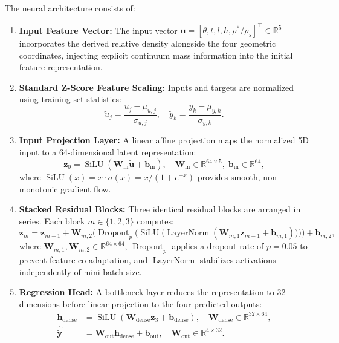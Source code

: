 The neural architecture consists of:
\begin{enumerate}
\item \textbf{Input Feature Vector:} The input vector $\mathbf{u} = [\theta, t, l, h, \rho^*/\rho_s]^\top \in \mathbb{R}^5$ incorporates the derived relative density alongside the four geometric coordinates, injecting explicit continuum mass information into the initial feature representation.
\item \textbf{Standard Z-Score Feature Scaling:} Inputs and targets are normalized using training-set statistics:
\begin{equation}
\tilde{u}_j = \frac{u_j - \mu_{u,j}}{\sigma_{u,j}}, \quad \tilde{y}_k = \frac{y_k - \mu_{y,k}}{\sigma_{y,k}}.
\label{eq:zscore_scaling}
\end{equation}
\item \textbf{Input Projection Layer:} A linear affine projection maps the normalized 5D input to a 64-dimensional latent representation:
\begin{equation}
\mathbf{z}_0 = \operatorname{SiLU}(\mathbf{W}_{\text{in}} \tilde{\mathbf{u}} + \mathbf{b}_{\text{in}}), \quad \mathbf{W}_{\text{in}} \in \mathbb{R}^{64 \times 5}, \; \mathbf{b}_{\text{in}} \in \mathbb{R}^{64},
\label{eq:input_projection}
\end{equation}
where $\operatorname{SiLU}(x) = x \cdot \sigma(x) = x / (1 + e^{-x})$ provides smooth, non-monotonic gradient flow.
\item \textbf{Stacked Residual Blocks:} Three identical residual blocks are arranged in series. Each block $m \in \{1, 2, 3\}$ computes:
\begin{equation}
\mathbf{z}_m = \mathbf{z}_{m-1} + \mathbf{W}_{m,2} \Big( \operatorname{Dropout}_p \Big( \operatorname{SiLU} \big( \operatorname{LayerNorm}(\mathbf{W}_{m,1} \mathbf{z}_{m-1} + \mathbf{b}_{m,1}) \big) \Big) \Big) + \mathbf{b}_{m,2},
\label{eq:resblock_math}
\end{equation}
where $\mathbf{W}_{m,1}, \mathbf{W}_{m,2} \in \mathbb{R}^{64 \times 64}$, $\operatorname{Dropout}_p$ applies a dropout rate of $p = 0.05$ to prevent feature co-adaptation, and $\operatorname{LayerNorm}$ stabilizes activations independently of mini-batch size.
\item \textbf{Regression Head:} A bottleneck layer reduces the representation to 32 dimensions before linear projection to the four predicted outputs:
\begin{align}
\mathbf{h}_{\text{dense}} &= \operatorname{SiLU}(\mathbf{W}_{\text{dense}} \mathbf{z}_3 + \mathbf{b}_{\text{dense}}), \quad \mathbf{W}_{\text{dense}} \in \mathbb{R}^{32 \times 64}, \\
\hat{\tilde{\mathbf{y}}} &= \mathbf{W}_{\text{out}} \mathbf{h}_{\text{dense}} + \mathbf{b}_{\text{out}}, \quad \mathbf{W}_{\text{out}} \in \mathbb{R}^{4 \times 32}.
\label{eq:output_head}
\end{align}
\end{enumerate}

